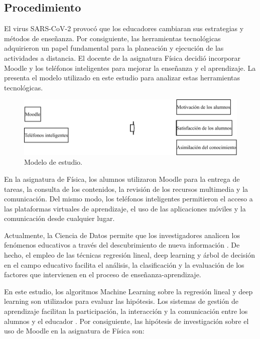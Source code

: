 \documentclass[spanish]{textolivre}
\begin{document}
\subsection{Procedimiento}
El virus SARS-CoV-2 provocó que los educadores cambiaran sus estrategias y métodos de enseñanza. Por consiguiente, las herramientas tecnológicas adquirieron un papel fundamental para la planeación y ejecución de las actividades a distancia. El docente de la asignatura Física decidió incorporar Moodle y los teléfonos inteligentes para mejorar la enseñanza y el aprendizaje. La  presenta el modelo utilizado en este estudio para analizar estas herramientas tecnológicas.

\begin{figure}[htbp]
\centering
\begin{minipage}{.85\textwidth}
 \includegraphics[width=\textwidth]{Image1.pdf}
 \caption{Modelo de estudio.}
 \label{fig01}
\end{minipage}
\end{figure}

En la asignatura de Física, los alumnos utilizaron Moodle para la entrega de tareas, la consulta de los contenidos, la revisión de los recursos multimedia y la comunicación. Del mismo modo, los teléfonos inteligentes permitieron el acceso a las plataformas virtuales de aprendizaje, el uso de las aplicaciones móviles y la comunicación desde cualquier lugar.

Actualmente, la Ciencia de Datos permite que los investigadores analicen los fenómenos educativos a través del descubrimiento de nueva información \cite{salas-rueda_use_2021}. De hecho, el empleo de las técnicas regresión lineal, deep learning y árbol de decisión en el campo educativo facilita el análisis, la clasificación y la evaluación de los factores que intervienen en el proceso de enseñanza-aprendizaje.

En este estudio, los algoritmos Machine Learning sobre la regresión lineal y deep learning son utilizados para evaluar las hipótesis. Los sistemas de gestión de aprendizaje facilitan la participación, la interacción y la comunicación entre los alumnos y el educador \cite{karahisar_research_2022, koyuncu_classification_2022}. Por consiguiente, las hipótesis de investigación sobre el uso de Moodle en la asignatura de Física son:
\end{document}

